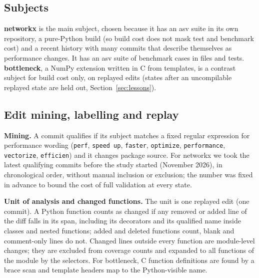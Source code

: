 \subsection{Subjects}
\textbf{networkx} is the main subject, chosen because it has an asv suite in its own repository, a pure-Python build (so build cost does not mask test and benchmark cost) and a recent history with many commits that describe themselves as performance changes. It has an asv suite of \NxBenchCases{} benchmark cases in \NxBenchFiles{} files and \NxNumTests{} tests.
\textbf{bottleneck}, a NumPy extension written in C from templates, is a contrast subject for build cost only, on \BnEdits{} replayed edits (states after an uncompilable replayed state are held out, Section~\ref{sec:lessons}).

\subsection{Edit mining, labelling and replay}
\textbf{Mining.} A commit qualifies if its subject matches a fixed regular expression for performance wording (\texttt{perf}, \texttt{speed up}, \texttt{faster}, \texttt{optimize}, \texttt{performance}, \texttt{vectorize}, \texttt{efficien}) and it changes package source.
For networkx we took the latest \NxMined{} qualifying commits before the study started (November 2026), in chronological order, without manual inclusion or exclusion; the number was fixed in advance to bound the cost of full validation at every state.

\textbf{Unit of analysis and changed functions.} The unit is one replayed edit (one commit).
A Python function counts as changed if any removed or added line of the diff falls in its span, including its decorators and its qualified name inside classes and nested functions; added and deleted functions count, blank and comment-only lines do not.
Changed lines outside every function are module-level changes; they are excluded from coverage counts and expanded to all functions of the module by the selectors.
For bottleneck, C function definitions are found by a brace scan and template headers map to the Python-visible name.

